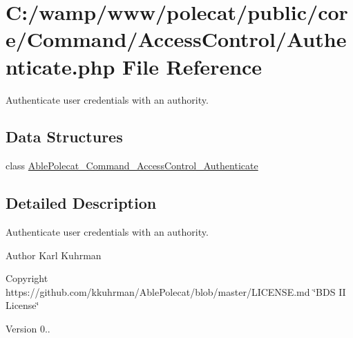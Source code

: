 \hypertarget{_authenticate_8php}{}\section{C\+:/wamp/www/polecat/public/core/\+Command/\+Access\+Control/\+Authenticate.php File Reference}
\label{_authenticate_8php}


Authenticate user credentials with an authority.  


\subsection*{Data Structures}
\begin{DoxyCompactItemize}
\item 
class \hyperlink{class_able_polecat___command___access_control___authenticate}{Able\+Polecat\+\_\+\+Command\+\_\+\+Access\+Control\+\_\+\+Authenticate}
\end{DoxyCompactItemize}


\subsection{Detailed Description}
Authenticate user credentials with an authority. 

\begin{DoxyAuthor}{Author}
Karl Kuhrman 
\end{DoxyAuthor}
\begin{DoxyCopyright}{Copyright}
https\+://github.com/kkuhrman/\+Able\+Polecat/blob/master/\+L\+I\+C\+E\+N\+S\+E.\+md \char`\"{}\+B\+D\+S I\+I License\char`\"{} 
\end{DoxyCopyright}
\begin{DoxyVersion}{Version}
0.. 
\end{DoxyVersion}
